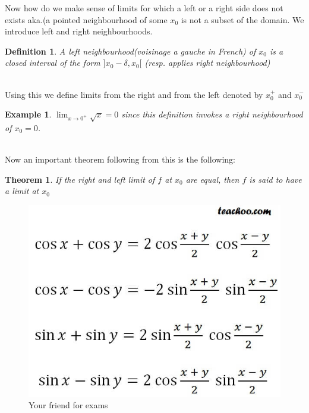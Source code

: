 \documentclass[titlepage]{article}
\newtheorem{theorem}{Theorem}[section]
\newtheorem{definition}{Definition}
\newtheorem{example}{Example}[section]
\begin{document}
Now how do we make sense of limits for which a left or a right side does not exists aka.(a pointed neighbourhood of some $x_{0}$ is not a subset of the domain. We introduce left and right neighbourhoods. 

\begin{definition}
A left neighbourhood(voisinage a gauche in French) of $x_{0}$ is a closed interval of the form $]x_{0} - \delta, x_{0}[$ (resp. applies right neighbourhood)
\end{definition}
\\

Using this we define limits from the right and from the left denoted by $x_{0}^{+}$ and $x_{0}^{-}$
\\

\begin{example}
$\lim_{x\to 0^{+}} \sqrt{x} = 0$ since this definition invokes a right neighbourhood of $x_{0} = 0$. 
\end{example}
\\

Now an important theorem following from this is the following:

\begin{theorem}
If the right and left limit of $f$ at $x_{0}$ are equal, then $f$ is said to \textit{have a limit at $x_{0}$}
\end{theorem}

\begin{figure}[H]
    \centering
    \includegraphics[scale = 0.3]{epflLectureNotes/analysis/figures/formula.jpg}
    \caption{Your friend for exams}
    \label{fig:my_label}
\end{figure}
\end{document}
